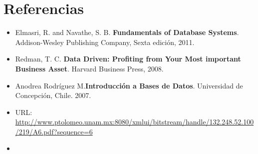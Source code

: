 \documentclass[letterpaper,12pt]{article}
\begin{document}
            \section*{Referencias}
            \begin{itemize}

            	\item Elmasri, R. and Navathe, S. B. \textbf{Fundamentals of Database Systems}. Addison-Wesley Publishing Company, Sexta edición, 2011.
            	\item Redman, T. C. \textbf{Data Driven: Profiting from Your Most important Business Asset}. Harvard Business Press, 2008.

              \item Anodrea Rodríguez M.\textbf{Introducción a Bases de Datos}. Universidad de Concepción, Chile. 2007.

              \item URL: \url{http://www.ptolomeo.unam.mx:8080/xmlui/bitstream/handle/132.248.52.100/219/A6.pdf?sequence=6}

              \item



            \end{itemize}

            
\end{document}
